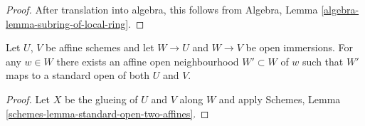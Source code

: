 \begin{proof}
After translation into algebra, this follows from
Algebra, Lemma \ref{algebra-lemma-subring-of-local-ring}.
\end{proof}

\begin{lemma}
\label{lemma-standard-open-two-affines}
Let $U$, $V$ be affine schemes and let $W \to U$ and $W \to V$
be open immersions. For any $w \in W$ there exists an affine
open neighbourhood $W' \subset W$ of $w$ such that $W'$
maps to a standard open of both $U$ and $V$.
\end{lemma}

\begin{proof}
Let $X$ be the glueing of $U$ and $V$ along $W$ and
apply Schemes, Lemma \ref{schemes-lemma-standard-open-two-affines}.
\end{proof}













